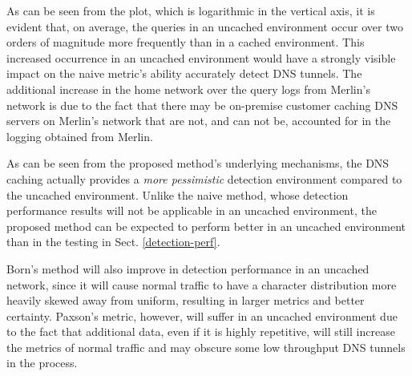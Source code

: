 \documentclass{llncs}
\begin{document}
As can be seen from the plot, which is logarithmic in the vertical axis, it is
evident that, on average, the queries in an uncached environment occur over two
orders of magnitude more frequently than in a cached environment. This increased
occurrence in an uncached environment would have a strongly visible impact on
the naive metric's ability accurately detect DNS tunnels. The additional
increase in the home network over the query logs from Merlin's network is due to
the fact that there may be on-premise customer caching DNS servers on Merlin's
network that are not, and can not be, accounted for in the logging obtained from
Merlin.

As can be seen from the proposed method's underlying mechanisms, the DNS caching
actually provides a \emph{more pessimistic} detection environment compared to
the uncached environment. Unlike the naive method, whose detection performance
results will not be applicable in an uncached environment, the proposed method
can be expected to perform better in an uncached environment than in the
testing in Sect. \ref{detection-perf}.

Born's method will also improve in detection performance in an uncached network,
since it will cause normal traffic to have a character distribution more heavily
skewed away from uniform, resulting in larger metrics and better certainty.
Paxson's metric, however, will suffer in an uncached environment due to the fact
that additional data, even if it is highly repetitive, will still increase the
metrics of normal traffic and may obscure some low throughput DNS tunnels in the 
process.

%
%
%
%
%
%
%
\end{document}
